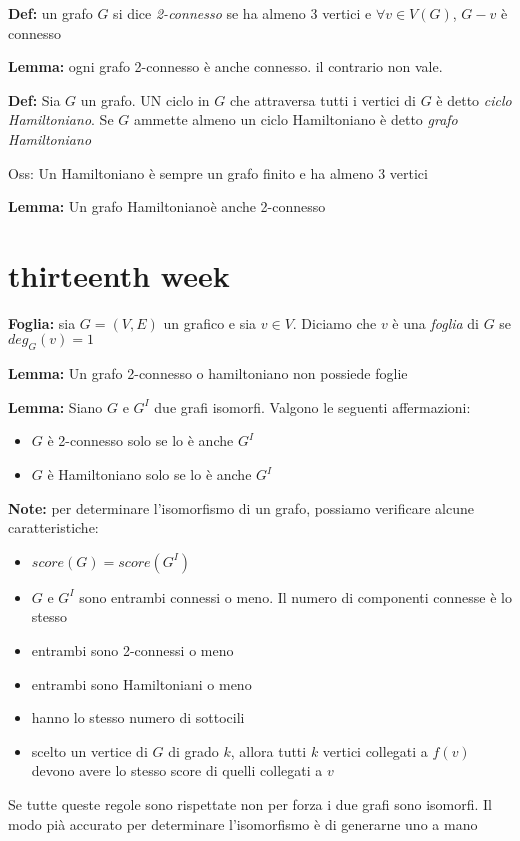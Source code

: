 \documentclass[12pt, a4paper]{article}
\begin{document}
\textbf{Def:} un grafo $G$ si dice \textit{2-connesso} se ha almeno 3 vertici e $\forall v\in V(G)$, $G-v$ è connesso

\textbf{Lemma:} ogni grafo 2-connesso è anche connesso. il contrario non vale.

\textbf{Def:} Sia $G$ un grafo. UN ciclo in $G$ che attraversa tutti i vertici di $G$ è detto \textit{ciclo 
Hamiltoniano}. Se $G$ ammette almeno un ciclo Hamiltoniano è  detto \textit{grafo Hamiltoniano}

Oss: Un Hamiltoniano è  sempre un grafo finito e ha almeno 3 vertici

\textbf{Lemma:} Un grafo Hamiltonianoè anche 2-connesso


\newpage
\section{thirteenth week}
\textbf{Foglia:} sia $G=(V,E)$ un grafico e sia $v\in V$. Diciamo che $v$ è una \textit{foglia} di $G$ se 
$deg_{G}(v)=1$

\textbf{Lemma:} Un grafo 2-connesso o hamiltoniano non possiede foglie

\textbf{Lemma:} Siano $G$ e $G^{I}$ due grafi isomorfi. Valgono le seguenti affermazioni:
\begin{itemize}
    \item $G$ è 2-connesso solo se lo è anche $G^{I}$
    \item $G$ è Hamiltoniano solo se lo è anche $G^{I}$
\end{itemize}

\textbf{Note:} per determinare l'isomorfismo di un grafo, possiamo verificare alcune caratteristiche:
\begin{itemize}
    \item $score(G)=score(G^{I})$
    \item $G$ e $G^{I}$ sono entrambi connessi o meno. Il numero di componenti connesse è lo stesso
    \item entrambi sono 2-connessi o meno
    \item entrambi sono Hamiltoniani o meno
    \item hanno lo stesso numero di sottocili
    \item scelto un vertice di $G$ di grado $k$, allora tutti $k$ vertici collegati a $f(v)$ devono avere lo 
    stesso score di quelli collegati a $v$
\end{itemize}
Se tutte queste regole sono rispettate non per forza i due grafi sono isomorfi. Il modo pià accurato per determinare
l'isomorfismo è di generarne uno a mano 
\end{document}

